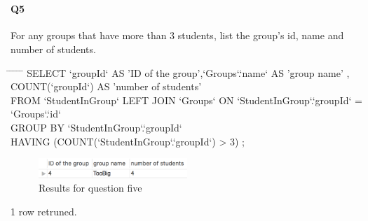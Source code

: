 \documentclass[paper=a4, fontsize=11pt]{scrartcl} %
\numberwithin{equation}{section} %
\numberwithin{figure}{section} %
\numberwithin{table}{section} %
\begin{document}
    \section{ }
    \paragraph{Q5}For any groups that have more than 3 students, list the group’s id, name and number of students.
    \begin{center}
        \begin{minipage}{10cm}
        \begin{tabbing}
            \hspace*{.25in} \= \hspace*{.25in} \= \hspace*{.25in} \= \hspace*{.25in} \= \hspace*{.25in} \=\kill
            {\color{blue}SELECT `groupId` AS 'ID of the group',`Groups`.`name` AS 'group name' , COUNT(`groupId`) AS 'number of students'}\\
            \> {\color{blue}FROM `StudentInGroup` LEFT JOIN `Groups` ON `StudentInGroup`.`groupId` = `Groups`.`id`} \\
            \> {\color{blue}GROUP BY `StudentInGroup`.`groupId`}\\
            \> {\color{blue}HAVING (COUNT(`StudentInGroup`.`groupId`) > 3) ;}\\
        
        \end{tabbing}
        \end{minipage}
    \end{center}
    \begin{figure}[htbp!]
        \centering
        \includegraphics[width=0.5\textwidth]{q51.png}
        \caption{Results for question five}%
        \vspace{-1em}
    \end{figure}
    {\color{red} 1 row retruned.}

    \section{ }
\end{document}
